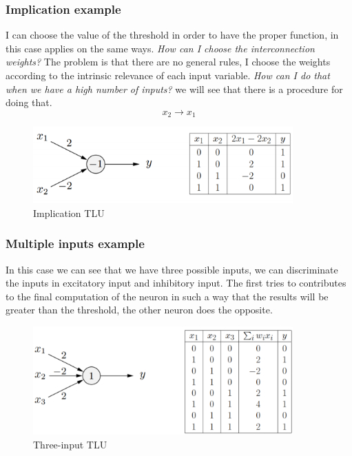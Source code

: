 \documentclass{article}
\begin{document}
\subsubsection{Implication example}
I can choose the value of the threshold in order to have the proper function, in this case applies on the same ways.
\textit{How can I choose the interconnection weights?}
\newline\newline
The problem is that there are no general rules, I choose the weights according to the intrinsic relevance of each
input variable.
\newline\newline
\textit{How can I do that when we have a high number of inputs?} we will see that there is a procedure for doing that.
$$x_2\rightarrow x_1$$
\begin{figure}[H]
    \centering
    \includegraphics[width=10cm]{images/impl_TLU.png}
    \caption{Implication TLU}
    \label{fig:tlu_implication}
\end{figure}

\subsubsection{Multiple inputs example}
In this case we can see that we have three possible inputs, we can discriminate the
inputs in excitatory input and inhibitory input. The first tries to contributes
to the final computation of the neuron in such a way that the results
will be greater than the threshold, the other neuron does the opposite.
\begin{figure}[H]
    \centering
    \includegraphics[width=10cm]{images/complex_TLU.png}
    \caption{Three-input TLU}
    \label{fig:tlu_3_input}
\end{figure}
\end{document}
